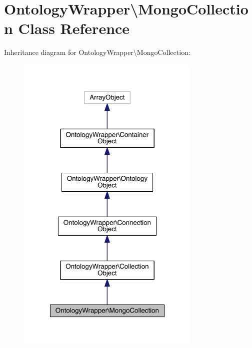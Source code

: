 \hypertarget{class_ontology_wrapper_1_1_mongo_collection}{\section{Ontology\-Wrapper\textbackslash{}Mongo\-Collection Class Reference}
\label{class_ontology_wrapper_1_1_mongo_collection}
}


Inheritance diagram for Ontology\-Wrapper\textbackslash{}Mongo\-Collection\-:
\nopagebreak
\begin{figure}[H]
\begin{center}
\leavevmode
\includegraphics[width=250pt]{class_ontology_wrapper_1_1_mongo_collection__inherit__graph}
\end{center}
\end{figure}


